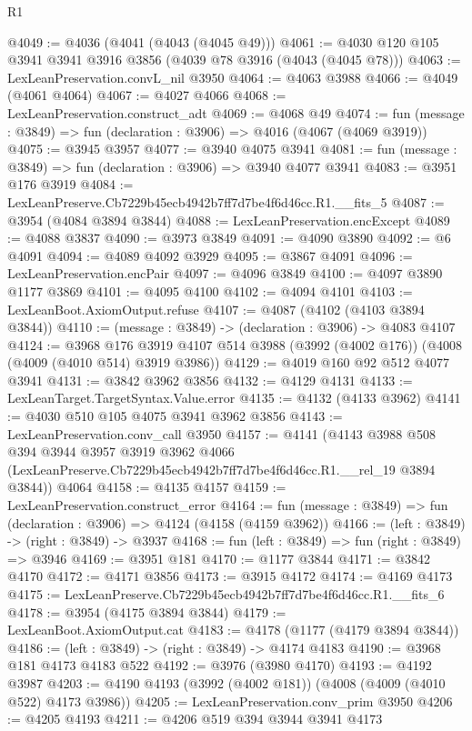 \begin{lexlean}{R1}
\begin{coremodule}
@4049 := @4036 (@4041 (@4043 (@4045 @49)))
@4061 := @4030 @120 @105 @3941 @3941 @3916 @3856 (@4039 @78 @3916 (@4043 (@4045 @78)))
@4063 := LexLeanPreservation.convL_nil @3950
@4064 := @4063 @3988
@4066 := @4049 (@4061 @4064)
@4067 := @4027 @4066
@4068 := LexLeanPreservation.construct_adt
@4069 := @4068 @49
@4074 := fun (message : @3849) => fun (declaration : @3906) => @4016 (@4067 (@4069 @3919))
@4075 := @3945 @3957
@4077 := @3940 @4075 @3941
@4081 := fun (message : @3849) => fun (declaration : @3906) => @3940 @4077 @3941
@4083 := @3951 @176 @3919
@4084 := LexLeanPreserve.Cb7229b45ecb4942b7ff7d7be4f6d46cc.R1.__fits_5
@4087 := @3954 (@4084 @3894 @3844)
@4088 := LexLeanPreservation.encExcept
@4089 := @4088 @3837
@4090 := @3973 @3849
@4091 := @4090 @3890
@4092 := @6 @4091
@4094 := @4089 @4092 @3929
@4095 := @3867 @4091
@4096 := LexLeanPreservation.encPair
@4097 := @4096 @3849
@4100 := @4097 @3890 @1177 @3869
@4101 := @4095 @4100
@4102 := @4094 @4101
@4103 := LexLeanBoot.AxiomOutput.refuse
@4107 := @4087 (@4102 (@4103 @3894 @3844))
@4110 := (message : @3849) -> (declaration : @3906) -> @4083 @4107
@4124 := @3968
    @176
    @3919
    @4107
    @514
    @3988
    (@3992 (@4002 @176))
    (@4008 (@4009 (@4010 @514) @3919 @3986))
@4129 := @4019 @160 @92 @512 @4077 @3941
@4131 := @3842 @3962 @3856
@4132 := @4129 @4131
@4133 := LexLeanTarget.TargetSyntax.Value.error
@4135 := @4132 (@4133 @3962)
@4141 := @4030 @510 @105 @4075 @3941 @3962 @3856
@4143 := LexLeanPreservation.conv_call @3950
@4157 := @4141
    (@4143
      @3988
      @508
      @394
      @3944
      @3957
      @3919
      @3962
      @4066
      (LexLeanPreserve.Cb7229b45ecb4942b7ff7d7be4f6d46cc.R1.__rel_19 @3894 @3844))
    @4064
@4158 := @4135 @4157
@4159 := LexLeanPreservation.construct_error
@4164 := fun (message : @3849) => fun (declaration : @3906) => @4124 (@4158 (@4159 @3962))
@4166 := (left : @3849) -> (right : @3849) -> @3937
@4168 := fun (left : @3849) => fun (right : @3849) => @3946
@4169 := @3951 @181
@4170 := @1177 @3844
@4171 := @3842 @4170
@4172 := @4171 @3856
@4173 := @3915 @4172
@4174 := @4169 @4173
@4175 := LexLeanPreserve.Cb7229b45ecb4942b7ff7d7be4f6d46cc.R1.__fits_6
@4178 := @3954 (@4175 @3894 @3844)
@4179 := LexLeanBoot.AxiomOutput.cat
@4183 := @4178 (@1177 (@4179 @3894 @3844))
@4186 := (left : @3849) -> (right : @3849) -> @4174 @4183
@4190 := @3968 @181 @4173 @4183 @522
@4192 := @3976 (@3980 @4170)
@4193 := @4192 @3987
@4203 := @4190 @4193 (@3992 (@4002 @181)) (@4008 (@4009 (@4010 @522) @4173 @3986))
@4205 := LexLeanPreservation.conv_prim @3950
@4206 := @4205 @4193
@4211 := @4206 @519 @394 @3944 @3941 @4173

\end{coremodule}
\end{lexlean}
